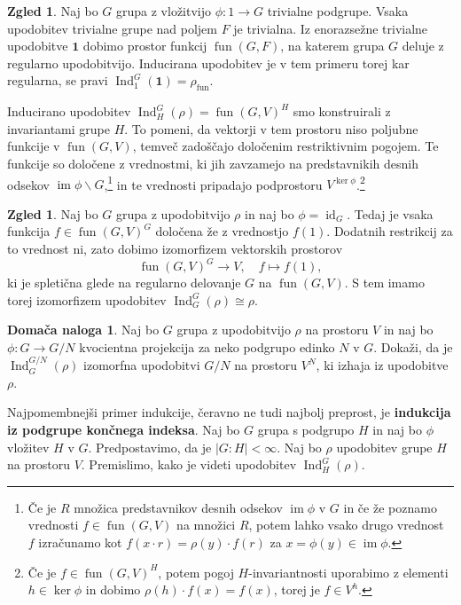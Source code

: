 \documentclass[11pt]{book}
\def\oneone{\mathbf{1}}
\DeclareMathOperator\image{im}
\DeclareMathOperator\Ind{Ind}
\DeclareMathOperator\fun{fun}
\DeclareMathOperator\id{id}
\def\definicija{\color{rdeca}\bf}
\theoremstyle{definition}
\theoremstyle{zgled}
\newtheorem{zgled}[theorem]{Zgled}
\theoremstyle{zgledbrezstevilke}
\theoremstyle{odprtproblem}
\theoremstyle{domacanaloga}
\newtheorem{domacanaloga}[theorem]{Domača naloga}
\theoremstyle{izrek}
\begin{document}
\begin{zgled}
Naj bo $G$ grupa z vložitvijo $\phi \colon 1 \to G$ trivialne podgrupe. Vsaka upodobitev trivialne grupe nad poljem $F$ je trivialna. Iz enorazsežne trivialne upodobitve $\oneone$ dobimo prostor funkcij $\fun(G,F)$, na katerem grupa $G$ deluje z regularno upodobitvijo. Inducirana upodobitev je v tem primeru torej kar regularna, se pravi $\Ind^G_1(\oneone) = \rho_{\fun}$.
\end{zgled}

Inducirano upodobitev $\Ind^G_H(\rho) = \fun(G,V)^H$ smo konstruirali z invariantami grupe $H$. To pomeni, da vektorji v tem prostoru niso poljubne funkcije v $\fun(G,V)$, temveč zadoščajo določenim restriktivnim pogojem. Te funkcije so določene z vrednostmi, ki jih zavzamejo na predstavnikih desnih odsekov $\image \phi \backslash G$,\footnote{Če je $R$ množica predstavnikov desnih odsekov $\image \phi$ v $G$ in če že poznamo vrednosti $f \in \fun(G,V)$ na množici $R$, potem lahko vsako drugo vrednost $f$ izračunamo kot $f(x \cdot r) = \rho(y) \cdot f(r)$ za $x = \phi(y) \in \image \phi$.} in te vrednosti pripadajo podprostoru $V^{\ker \phi}$.\footnote{Če je $f \in \fun(G,V)^H$, potem pogoj $H$-invariantnosti uporabimo z elementi $h \in \ker \phi$ in dobimo $\rho(h) \cdot f(x) = f(x)$, torej je $f \in V^h$.}

\begin{zgled}
Naj bo $G$ grupa z upodobitvijo $\rho$ in naj bo $\phi = \id_G$. Tedaj je vsaka funkcija $f \in \fun(G,V)^G$ določena že z vrednostjo $f(1)$. Dodatnih restrikcij za to vrednost ni, zato dobimo izomorfizem vektorskih prostorov
    \[
        \fun(G,V)^G \to V, \quad
        f \mapsto f(1),
    \]
ki je spletična glede na regularno delovanje $G$ na $\fun(G,V)$. S tem imamo torej izomorfizem upodobitev $\Ind^G_G(\rho) \cong \rho$.
\end{zgled}

\begin{domacanaloga}
    Naj bo $G$ grupa z upodobitvijo $\rho$ na prostoru $V$ in naj bo $\phi \colon G \to G/N$ kvocientna projekcija za neko podgrupo edinko $N$ v $G$. Dokaži, da je $\Ind^{G/N}_G(\rho)$ izomorfna upodobitvi $G/N$ na prostoru $V^N$, ki izhaja iz upodobitve $\rho$.
\end{domacanaloga}

Najpomembnejši primer indukcije, čeravno ne tudi najbolj preprost, je {\definicija indukcija iz podgrupe končnega indeksa}. Naj bo $G$ grupa s podgrupo $H$ in naj bo $\phi$ vložitev $H$ v $G$. Predpostavimo, da je $|G:H| < \infty$. Naj bo $\rho$ upodobitev grupe $H$ na prostoru $V$. Premislimo, kako je videti upodobitev $\Ind^G_H(\rho)$. 
    
\end{document}
